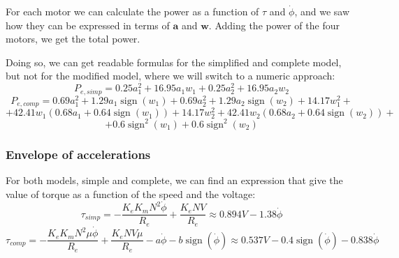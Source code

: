 \documentclass[12pt]{article}
\renewcommand{\vec}[1]{\bm{#1}}
\begin{document}
For each motor we can calculate the power as a function of $\tau$ and $\dot\phi$, and we saw how they can be expressed in terms of $\vec a$ and $\vec w$. Adding the power of the four motors, we get the total power.

Doing so, we can get readable formulas for the simplified and complete model, but not for the modified model, where we will switch to a numeric approach:
$$P_{e, simp} = 0.25 a_{1}^{2} + 16.95 a_{1} w_{1} + 0.25 a_{2}^{2} + 16.95 a_{2} w_{2}$$
$$P_{e, comp} = 0.69 a_{1}^{2} + 1.29 a_{1} \operatorname{sign}\left(w_{1}\right) + 0.69 a_{2}^{2} + 1.29 a_{2} \operatorname{sign}\left(w_{2}\right) + 14.17 w_{1}^{2} +$$
$$+ 42.41 w_{1} \left(0.68 a_{1} + 0.64 \operatorname{sign}\left(w_{1}\right)\right) + 14.17 w_{2}^{2} + 42.41 w_{2} \left(0.68 a_{2} + 0.64 \operatorname{sign}\left(w_{2}\right)\right) +$$
$$+ 0.6 \operatorname{sign}^{2}\left(w_{1}\right) + 0.6 \operatorname{sign}^{2}\left(w_{2}\right)$$
\subsubsection*{Envelope of accelerations}
For both models, simple and complete, we can find an expression that give the value of torque as a function of the speed and the voltage:
$$\tau_{simp} = \displaystyle - \frac{K_{e} K_{m} N^{2} \dot{\phi}}{R_{e}} + \frac{K_{e} N V}{R_{e}} \approx 0.894 V - 1.38 \dot{\phi}$$
$$\tau_{comp} = - \frac{K_{e} K_{m} N^{2} \mu \dot{\phi}}{R_{e}} + \frac{K_{e} N V \mu}{R_{e}} - a \dot{\phi} - b \operatorname{sign}\left(\dot{\phi}\right)\approx 0.537 V - 0.4 \operatorname{sign}\left(\dot{\phi}\right) - 0.838 \dot{\phi}$$
\end{document}
